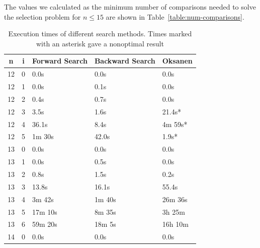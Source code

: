 \documentclass[10pt,journal,compsoc]{IEEEtran}
\begin{document}
The values we calculated as the minimum number of comparisons needed to solve the selection problem for $n \leq 15$ are shown in Table~\ref{table:num-comparisons}.

\begin{table}[!t]
  \renewcommand{\arraystretch}{1.2}
  \caption{Execution times of different search methods. Times marked with an asterisk gave a nonoptimal result}
  \label{table:search_algorithms}
  \centering
  \begin{tabular}{c|c|l|l|l}
    \textbf{n} & \textbf{i} & \textbf{Forward Search} & \textbf{Backward Search} & \textbf{Oksanen} \\
    \hline
    12         & 0          & 0.0s                    & 0.0s                     & 0.0s             \\
    12         & 1          & 0.0s                    & 0.1s                     & 0.0s             \\
    12         & 2          & 0.4s                    & 0.7s                     & 0.0s             \\
    12         & 3          & 3.5s                    & 1.6s                     & 21.4s*           \\
    12         & 4          & 36.1s                   & 8.4s                     & 4m 59s*          \\
    12         & 5          & 1m 30s                  & 42.0s                    & 1.9s*            \\
    \hline
    13         & 0          & 0.0s                    & 0.0s                     & 0.0s             \\
    13         & 1          & 0.0s                    & 0.5s                     & 0.0s             \\
    13         & 2          & 0.8s                    & 1.5s                     & 0.2s             \\
    13         & 3          & 13.8s                   & 16.1s                    & 55.4s            \\
    13         & 4          & 3m 42s                  & 1m 40s                   & 26m 36s          \\
    13         & 5          & 17m 10s                 & 8m 35s                   & 3h 25m           \\
    13         & 6          & 59m 20s                 & 18m 5s                   & 16h 10m          \\
    \hline
    14         & 0          & 0.0s                    & 0.0s                     & 0.0s             \\

\end{tabular}
\end{table}
\end{document}
